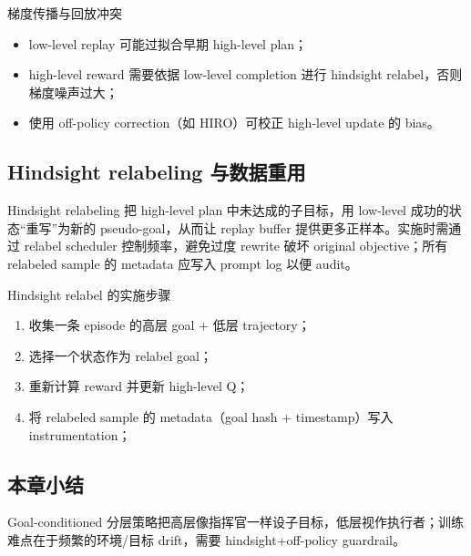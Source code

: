 \begin{warningbox}{梯度传播与回放冲突}
\begin{itemize}
    \item low-level replay 可能过拟合早期 high-level plan；
    \item high-level reward 需要依据 low-level completion 进行 hindsight relabel，否则梯度噪声过大；
    \item 使用 off-policy correction（如 HIRO）可校正 high-level update 的 bias。
\end{itemize}
\end{warningbox}

\subsection{Hindsight relabeling 与数据重用}

Hindsight relabeling 把 high-level plan 中未达成的子目标，用 low-level 成功的状态“重写”为新的 pseudo-goal，从而让 replay buffer 提供更多正样本。实施时需通过 relabel scheduler 控制频率，避免过度 rewrite 破坏 original objective；所有 relabeled sample 的 metadata 应写入 prompt log 以便 audit。

\begin{importantbox}{Hindsight relabel 的实施步骤}
\begin{enumerate}
    \item 收集一条 episode 的高层 goal + 低层 trajectory；
    \item 选择一个状态作为 relabel goal；
    \item 重新计算 reward 并更新 high-level Q；
    \item 将 relabeled sample 的 metadata（goal hash + timestamp）写入 instrumentation；
\end{enumerate}
\end{importantbox}

\subsection{本章小结}

Goal-conditioned 分层策略把高层像指挥官一样设子目标，低层视作执行者；训练难点在于频繁的环境/目标 drift，需要 hindsight+off-policy guardrail。

